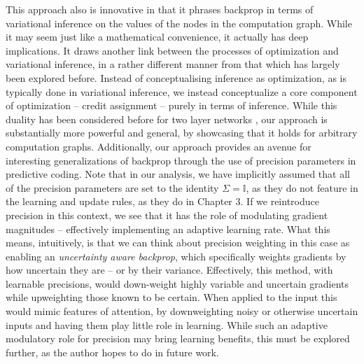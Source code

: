 This approach also is innovative in that it phrases backprop in terms of variational inference on the values of the nodes in the computation graph. While it may seem just like a mathematical convenience, it actually has deep implications. It draws another link between the processes of optimization and variational inference, in a rather different manner from that which has largely been explored before. Instead of conceptualising inference as optimization, as is typically done in variational inference, we instead conceptualize a core component of optimization -- credit assignment -- purely in terms of inference. While this duality has been considered before for two layer networks \citep{amari1995information}, our approach is substantially more powerful and general, by showcasing that it holds for arbitrary computation graphs. Additionally, our approach provides an avenue for interesting generalizations of backprop through the use of precision parameters in predictive coding. Note that in our analysis, we have implicitly assumed that all of the precision parameters are set to the identity $\Sigma = \mathbb{I}$, as they do not feature in the learning and update rules, as they do in Chapter 3. If we reintroduce precision in this context, we see that it has the role of modulating gradient magnitudes -- effectively implementing an adaptive learning rate. What this means, intuitively, is that we can think about precision weighting in this case as enabling an \emph{uncertainty aware backprop}, which specifically weights gradients by how uncertain they are -- or by their variance. Effectively, this method, with learnable precisions, would down-weight highly variable and uncertain gradients while upweighting those known to be certain. When applied to the input this would mimic features of attention, by downweighting noisy or otherwise uncertain inputs and having them play little role in learning. While such an adaptive modulatory role for precision may bring learning benefits, this must be explored further, as the author hopes to do in future work.


